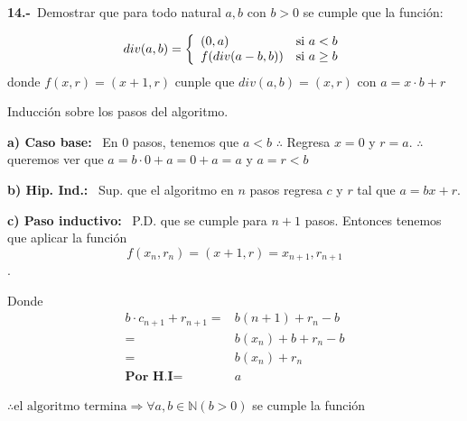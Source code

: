\textbf{14.-}\ Demostrar que para todo natural $a,b$ con $b > 0$ se cumple que la función:

\begingroup
\centering
\begin{equation}
    div(a,b) = \left\lbrace
    \begin{array}{ll}
     (0,a) & \textup{si } a<b\\
     f(div(a-b,b)) & \textup{si } a\geq b
    \end{array}
    \right.
\end{equation}
donde $f(x,r) = (x+1,r)$ cunple que $div(a,b)=(x,r)$ con $a=x\cdot b+r$

\endgroup

\vspace*{1em}
Inducción sobre los pasos del algoritmo.

\textbf{a) Caso base: }\ En $0$ pasos, tenemos que $a<b$ $\therefore$ Regresa $x=0$ y $r=a$. $\therefore$ queremos ver que $a=b\cdot 0 + a = 0+a=a$ y $a = r < b$

\textbf{b) Hip. Ind.: }\ Sup. que el algoritmo en $n$ pasos regresa $c$ y $r$ tal que $a=bx+r$.

\textbf{c) Paso inductivo: }\ P.D. que se cumple para $n+1$ pasos.
Entonces tenemos que aplicar la función $$f(x_n,r_n)=(x+1,r)=x_{n+1},r_{n+1}$$.


Donde 
\begin{align*}
    b\cdot c_{n+1}+r_{n+1}=&b(n+1)+r_{n}-b\\
    =&b(x_n)+b+r_n-b\\
    =&b(x_n)+r_n\\
\textbf{Por H.I}=&a
\end{align*}

$\therefore \text{el algoritmo termina}\Rightarrow \forall a,b\in \mathbb{N}(b>0)$ se cumple la función

